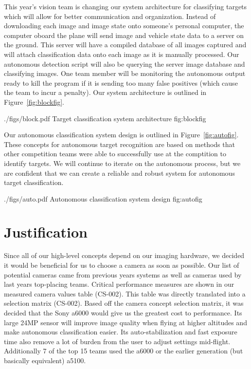 \documentclass[]{auvsi_doc}
\begin{document}
This year's vision team is changing our system architecture for classifying targets which will
 allow for better communication and organization. Instead of downloading each image and image state
onto someone's personal computer, the computer oboard the plane will send image and vehicle state
data to a server on the ground. This server will have a compiled database of all images captured
and will attach classification data onto each image as it is manually processed. Our
autonomous detection script will also be querying the server image database and classifying
images. One team member will be monitoring the autonomous output ready to kill the
program if it is sending too many false positives (which cause the team to incur a
penalty). Our system architecture is outlined in Figure~\ref{fig:blockfig}.

\AUVSIFigure
{./figs/block.pdf}
{\textwidth}
{Target classification system architecture}
{fig:blockfig}

Our autonomous classification system design is outlined in Figure~\ref{fig:autofig}.
These concepts for autonomous target recognition are based on methods that
other competition teams were able to successfully use at the comptition to
identify targets. We will continue to iterate on the autonomous process, but
we are confident that we can create a reliable and robust system for autonomous
target classification.

\AUVSIFigure
{./figs/auto.pdf}
{\textwidth}
{Autonomous classification system design}
{fig:autofig}

\section{Justification}

Since all of our high-level concepts depend on our imaging hardware, we decided it would be beneficial for us to choose a camera as 
soon as possible. Our list of potential cameras came from previous years systems as well as cameras used by last years top-placing 
teams. Critical performance measures are shown in our measured camera values table (CS-002). This table was directly translated 
into a selection matrix (CS-002). Based off the camera concept selection matrix, it was decided that the Sony a6000 would give us 
the greatest cost to performance. Its large 24MP sensor will improve image quality when flying at higher altitudes and make 
autonomous classification easier. Its auto-stabilization and fast exposure time also remove a lot of burden from the user to adjust 
settings mid-flight. Additionally 7 of the top 15 teams used the a6000 or the earlier generation (but basically equivalent) a5100.
\end{document}
